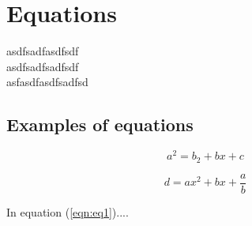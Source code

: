 \chapter{Equations}
asdfsadfasdfsdf\\
asdfsadfsadfsdf\\
asfasdfasdfsadfsd\\
\section{Examples of equations}

\begin{equation} \label{eqn:eq1}
    a^2=b_2+ bx +c 
\end{equation}

$$
d= ax^2+bx+\frac{a}{b}
$$

In equation (\ref{eqn:eq1})....

